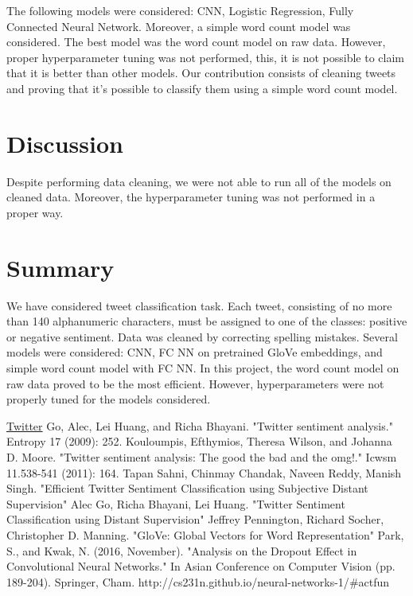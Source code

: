 \documentclass[10pt,conference,compsocconf]{IEEEtran}
\begin{document}
The following models were considered: CNN, Logistic Regression, Fully Connected Neural Network. Moreover, a simple word count model was considered. The best model was the word count model on raw data. However, proper hyperparameter tuning was not performed, this, it is not possible to claim that it is better than other models. Our contribution consists of cleaning tweets and proving that it's possible to classify them using a simple word count model.
\section{Discussion}
Despite performing data cleaning, we were not able to run all of the models on cleaned data. Moreover, the hyperparameter tuning was not performed in a proper way.
\section{Summary}
We have considered tweet classification task. Each tweet, consisting of no more than 140 alphanumeric characters, must be assigned to one of the classes: positive or negative sentiment. Data was cleaned by correcting spelling mistakes. Several models were considered: CNN, FC NN on pretrained GloVe embeddings, and simple word count model with FC NN. In this project, the word count model on raw data proved to be the most efficient. However, hyperparameters were not properly tuned for the models considered.

\begin{thebibliography}{99}

	 \href{http://twitter.com}{Twitter}
	 Go, Alec, Lei Huang, and Richa Bhayani. "Twitter sentiment analysis." Entropy 17 (2009): 252.
	 Kouloumpis, Efthymios, Theresa Wilson, and Johanna D. Moore. "Twitter sentiment analysis: The good the bad and the omg!." Icwsm 11.538-541 (2011): 164.
	 Tapan Sahni, Chinmay Chandak, Naveen Reddy, Manish Singh. "Efficient Twitter Sentiment Classification using Subjective Distant Supervision"
	 Alec Go, Richa Bhayani,	Lei Huang. "Twitter Sentiment Classification using Distant Supervision"
	 Jeffrey Pennington, Richard Socher, Christopher D. Manning. "GloVe: Global Vectors for Word Representation"
	 Park, S., and Kwak, N. (2016, November). "Analysis on the Dropout Effect in Convolutional Neural Networks." In Asian Conference on Computer Vision (pp. 189-204). Springer, Cham.
	 http://cs231n.github.io/neural-networks-1/{\#}actfun
\end{thebibliography}
\end{document}
